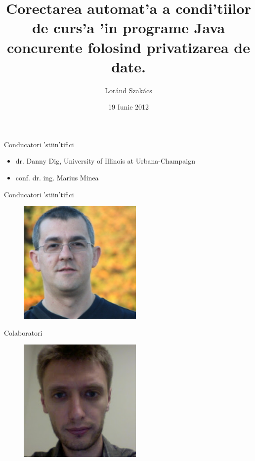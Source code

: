 \documentclass{beamer}
\title[]{Corectarea automat'a a condi'tiilor de curs'a 'in programe Java concurente
folosind privatizarea de date.}
\author{Lor\'{a}nd Szak\'{a}cs}
\institute{Universitatea Politehnica din Timi\c{s}oara}
\date{19 Iunie 2012}
\begin{document}
\begin{frame}
\titlepage
\end{frame}

\begin{frame}{Conducatori 'stiin'tifici}
\begin{itemize}
  \item dr. Danny Dig, University of Illinois at Urbana-Champaign
  \item conf. dr. ing. Marius Minea
\end{itemize}
\end{frame}

\begin{frame}{Conducatori 'stiin'tifici}
\begin{figure}[h!]
	\begin{center}
		\includegraphics[width=6cm]{content/figures/danny.jpg}
	\end{center}
\end{figure}
\end{frame}

\begin{frame}{Colaboratori}
\begin{figure}[h!]
	\begin{center}
		\includegraphics[width=6cm]{content/figures/cosmin.jpg}
	\end{center}
\end{figure}
\end{frame}
\end{document}
